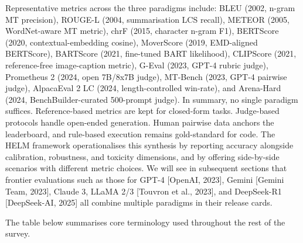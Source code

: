 Representative metrics across the three paradigms include: BLEU (2002, n-gram MT precision), ROUGE-L (2004, summarisation LCS recall), METEOR (2005, WordNet-aware MT metric), chrF (2015, character n-gram F1), BERTScore (2020, contextual-embedding cosine), MoverScore (2019, EMD-aligned BERTScore), BARTScore (2021, fine-tuned BART likelihood), CLIPScore (2021, reference-free image-caption metric), G-Eval (2023, GPT-4 rubric judge), Prometheus 2 (2024, open 7B/8x7B judge), MT-Bench (2023, GPT-4 pairwise judge), AlpacaEval 2 LC (2024, length-controlled win-rate), and Arena-Hard (2024, BenchBuilder-curated 500-prompt judge). In summary, no single paradigm suffices. Reference-based metrics are kept for closed-form tasks. Judge-based protocols handle open-ended generation. Human pairwise data anchors the leaderboard, and rule-based execution remains gold-standard for code. The HELM framework operationalises this synthesis by reporting accuracy alongside calibration, robustness, and toxicity dimensions, and by offering side-by-side scenarios with different metric choices. We will see in subsequent sections that frontier evaluations such as those for GPT-4 {[}OpenAI, 2023{]}, Gemini {[}Gemini Team, 2023{]}, Claude 3, LLaMA 2/3 {[}Touvron et al., 2023{]}, and DeepSeek-R1 {[}DeepSeek-AI, 2025{]} all combine multiple paradigms in their release cards.

The table below summarises core terminology used throughout the rest of the survey.

